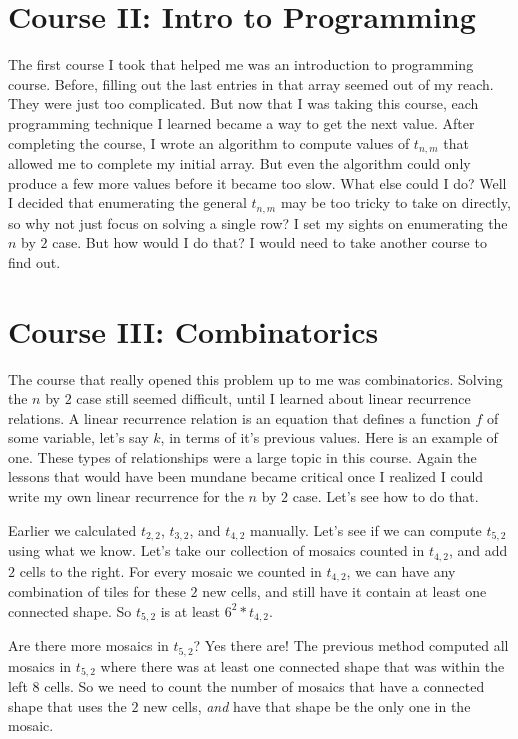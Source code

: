 \documentclass[12pt]{article}
\theoremstyle{plain}
\theoremstyle{definition}
\theoremstyle{remark}
\theoremstyle{definition}
\begin{document}
\section{Course II: Intro to Programming} %

The first course I took that helped me was an introduction to programming course. Before, filling out the last entries in that array seemed out of my reach. They were just too complicated. But now that I was taking this course, each programming technique I learned became a way to get the next value. After completing the course, I wrote an algorithm to compute values of $t_{n,m}$ that allowed me to complete my initial array. But even the algorithm could only produce a few more values before it became too slow.
What else could I do? Well I decided that enumerating the general $t_{n,m}$ may be too tricky to take on directly, so why not just focus on solving a single row? I set my sights on enumerating the $n$ by $2$ case. But how would I do that? I would need to take another course to find out.

\section{Course III: Combinatorics} %

The course that really opened this problem up to me was combinatorics. Solving the $n$ by $2$ case still seemed difficult, until I learned about linear recurrence relations. A linear recurrence relation is an equation that defines a function $f$ of some variable, let's say $k$, in terms of it's previous values. Here is an example of one. These types of relationships were a large topic in this course. Again the lessons that would have been mundane became critical once I realized I could write my own linear recurrence for the $n$ by $2$ case. Let's see how to do that. 

Earlier we calculated $t_{2,2}$, $t_{3,2}$, and $t_{4,2}$ manually. Let's see if we can compute $t_{5,2}$ using what we know. Let's take our collection of mosaics counted in $t_{4,2}$, and add $2$ cells to the right. For every mosaic we counted in $t_{4,2}$, we can have any combination of tiles for these $2$ new cells, and still have it contain at least one connected shape. So $t_{5,2}$ is at least $6^2 * t_{4,2}$. 

Are there more mosaics in $t_{5,2}$? Yes there are! The previous method computed all mosaics in $t_{5,2}$ where there was at least one connected shape that was within the left $8$ cells. So we need to count the number of mosaics that have a connected shape that uses the $2$ new cells, \textit{and} have that shape be the only one in the mosaic. 
\end{document}
